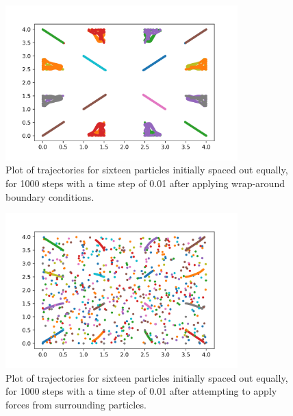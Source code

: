 \documentclass{article}
\begin{document}
\begin{figure}[H]
	\centering
	\includegraphics[width=0.8\textwidth]{../images/bdry.png}
	\caption{Plot of trajectories for sixteen particles initially spaced out equally, for 1000 steps with a time step of 0.01 after applying wrap-around boundary conditions.}
	\label{fig:q3_bdry}
\end{figure}

\begin{figure}[H]
	\centering
	\includegraphics[width=0.8\textwidth]{../images/bdry_2.png}
	\caption{Plot of trajectories for sixteen particles initially spaced out equally, for 1000 steps with a time step of 0.01 after attempting to apply forces from surrounding particles.}
	\label{fig:q3_bdry_2}
\end{figure}
\end{document}
